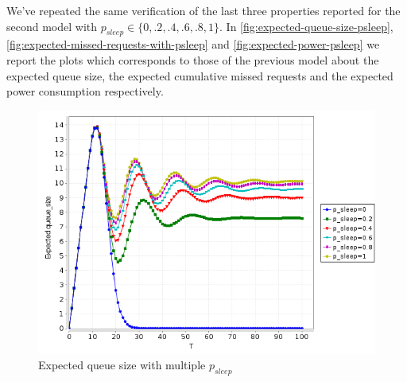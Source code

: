 We've repeated the same verification of the last three properties
reported for the second model with $p_{sleep} \in \{0, .2, .4, .6, .8,
1\}$. In \autoref{fig:expected-queue-size-psleep},
\autoref{fig:expected-missed-requests-with-psleep} and
\autoref{fig:expected-power-psleep} we report the plots which
corresponds to those of the previous model about the expected queue
size, the expected cumulative missed requests and the expected power
consumption respectively.
\begin{figure}[htb]
  \centering
  \includegraphics[width=13cm]{quantitative-project/expected-queue-size-with-psleep.png}
  \caption{Expected queue size with multiple $p_{sleep}$}
  \label{fig:expected-queue-size-psleep}
\end{figure}

